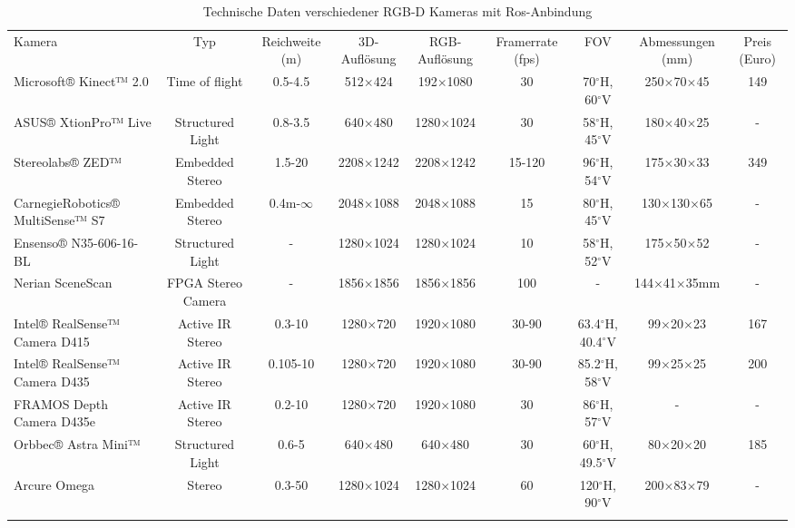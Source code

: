 
\begin {table}[th!]
\setlength{\tabcolsep}{0.6mm}
\begin{tiny}
 \centering
 \caption{Technische Daten verschiedener RGB-D Kameras mit Ros-Anbindung}
 \label{tab:Kameras}
 \begin{tabulary}{\textwidth}{ L C C C C C C C C }
  \hhline{=========}
    Kamera & Typ & Reichweite (m) & 3D-Auflösung & RGB-Auflösung & Framerrate (fps) & FOV & Abmessungen (mm) & Preis (Euro)\\
  \hhline{=========}
  Microsoft® Kinect™ 2.0 & Time of flight & 0.5-4.5 & 512$\times$424 & 192$\times$1080 & 30 & 70$^\circ$H, 60$^\circ$V & 250$\times$70$\times$45 & 149  \\
  \hhline{---------}
  ASUS® XtionPro™ Live & Structured Light &  0.8-3.5 & 640$\times$480 & 1280$\times$1024 & 30 & 58$^\circ$H, 45$^\circ$V & 180$\times$40$\times$25 & - \\
  \hhline{---------}
  Stereolabs® ZED™& Embedded Stereo & 1.5-20 & 2208$\times$1242 & 2208$\times$1242 & 15-120 & 96$^\circ$H, 54$^\circ$V & 175$\times$30$\times$33 & 349 \\
  \hhline{---------}
  CarnegieRobotics® MultiSense™ S7 & Embedded Stereo & 0.4m-$\infty$ & 2048$\times$1088 & 2048$\times$1088 & 15 & 80$^\circ$H, 45$^\circ$V & 130$\times$130$\times$65 & - \\
  \hhline{---------}
  Ensenso® N35-606-16-BL & Structured Light & - & 1280$\times$1024 & 1280$\times$1024 & 10 & 58$^\circ$H, 52$^\circ$V & 175$\times$50$\times$52 & - \\
  \hhline{---------}
  Nerian SceneScan & FPGA Stereo Camera & - & 1856$\times$1856 & 1856$\times$1856 & 100 & - & 144$\times$41$\times$35mm & - \\
  \hhline{---------}
  Intel® RealSense™ Camera D415 & Active IR Stereo & 0.3-10 & 1280$\times$720 & 1920$\times$1080 & 30-90 & 63.4$^\circ$H, 40.4$^\circ$V & 99$\times$20$\times$23 & 167 \\
  \hhline{---------}
  Intel® RealSense™ Camera D435 & Active IR Stereo & 0.105-10 & 1280$\times$720 & 1920$\times$1080 & 30-90 & 85.2$^\circ$H, 58$^\circ$V & 99$\times$25$\times$25 & 200 \\
  \hhline{---------}
  FRAMOS Depth Camera D435e & Active IR Stereo & 0.2-10 & 1280$\times$720 & 1920$\times$1080 & 30 & 86$^\circ$H, 57$^\circ$V & - & - \\
  \hhline{---------}
  Orbbec® Astra Mini™ & Structured Light & 0.6-5 & 640$\times$480 & 640$\times$480 & 30 & 60$^\circ$H, 49.5$^\circ$V & 80$\times$20$\times$20 & 185 \\
  \hhline{---------}
  Arcure Omega & Stereo & 0.3-50 & 1280$\times$1024 & 1280$\times$1024 & 60 & 120$^\circ$H, 90$^\circ$V & 200$\times$83$\times$79 & - \\
   \hhline{=========}
\end{tabulary}
\end{tiny}
\end{table}
